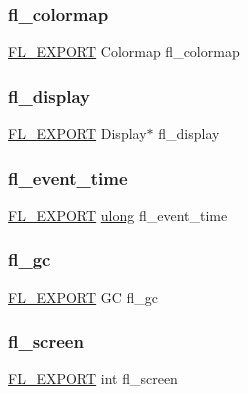 \subsubsection{\texorpdfstring{fl\+\_\+colormap}{fl\_colormap}}
{\footnotesize\ttfamily \hyperlink{_fl___export_8_h_aa9ba29a18aee9d738370a06eeb4470fc}{F\+L\+\_\+\+E\+X\+P\+O\+RT} Colormap fl\+\_\+colormap}

\mbox{\label{x_8_h_ae4842a1fc7d2d7b95afeaba5611fc426}} 
\subsubsection{\texorpdfstring{fl\+\_\+display}{fl\_display}}
{\footnotesize\ttfamily \hyperlink{_fl___export_8_h_aa9ba29a18aee9d738370a06eeb4470fc}{F\+L\+\_\+\+E\+X\+P\+O\+RT} Display$\ast$ fl\+\_\+display}

\mbox{\label{x_8_h_a5112b03f22e38209736b7d21a6d100ab}} 
\subsubsection{\texorpdfstring{fl\+\_\+event\+\_\+time}{fl\_event\_time}}
{\footnotesize\ttfamily \hyperlink{_fl___export_8_h_aa9ba29a18aee9d738370a06eeb4470fc}{F\+L\+\_\+\+E\+X\+P\+O\+RT} \hyperlink{fl__types_8h_a718b4eb2652c286f4d42dc18a8e71a1a}{ulong} fl\+\_\+event\+\_\+time}

\mbox{\label{x_8_h_a6a655a6955c7b194471666e8055ca876}} 
\subsubsection{\texorpdfstring{fl\+\_\+gc}{fl\_gc}}
{\footnotesize\ttfamily \hyperlink{_fl___export_8_h_aa9ba29a18aee9d738370a06eeb4470fc}{F\+L\+\_\+\+E\+X\+P\+O\+RT} GC fl\+\_\+gc}

\mbox{\label{x_8_h_a42a55d8c59138d9f0fa899491c25560c}} 
\subsubsection{\texorpdfstring{fl\+\_\+screen}{fl\_screen}}
{\footnotesize\ttfamily \hyperlink{_fl___export_8_h_aa9ba29a18aee9d738370a06eeb4470fc}{F\+L\+\_\+\+E\+X\+P\+O\+RT} int fl\+\_\+screen}

